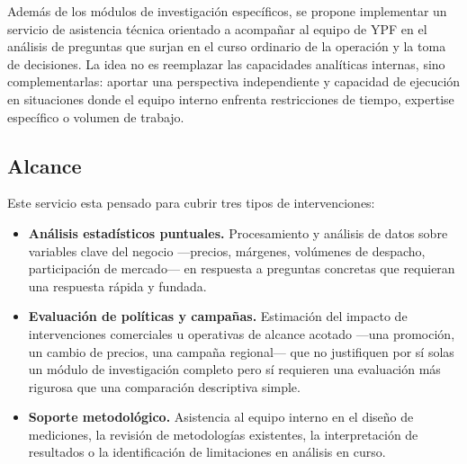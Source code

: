 Además de los módulos de investigación específicos, se propone implementar un servicio de asistencia técnica orientado a acompañar al equipo de YPF en el análisis de preguntas que surjan en el curso ordinario de la operación y la toma de decisiones. La idea no es reemplazar las capacidades analíticas internas, sino complementarlas: aportar una perspectiva independiente y capacidad de ejecución en situaciones donde el equipo interno enfrenta restricciones de tiempo, expertise específico o volumen de trabajo.

\subsection{Alcance}

Este servicio esta pensado para cubrir tres tipos de intervenciones:

\begin{itemize}

    \item \textbf{Análisis estadísticos puntuales.} Procesamiento y análisis de datos sobre variables clave del negocio —precios, márgenes, volúmenes de despacho, participación de mercado— en respuesta a preguntas concretas que requieran una respuesta rápida y fundada.

    \item \textbf{Evaluación de políticas y campañas.} Estimación del impacto de intervenciones comerciales u operativas de alcance acotado —una promoción,  un cambio de precios, una campaña regional— que no justifiquen por sí solas  un módulo de investigación completo pero sí requieren una evaluación más  rigurosa que una comparación descriptiva simple.

    \item \textbf{Soporte metodológico.} Asistencia al equipo interno en el diseño de mediciones, la revisión de metodologías existentes, la interpretación de resultados o la identificación de limitaciones en análisis en curso.

\end{itemize}
